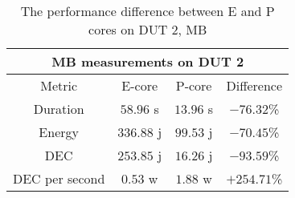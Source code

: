 \begin{table}[H]
    \centering
    \begin{tabular}{|| c | c | c | c ||}
    \hline
    \multicolumn{4}{||c||}{MB measurements on DUT 2} \\ [0.5ex] \hline\hline
    Metric & E-core & P-core & Difference \\\hline
    Duration & $58.96$ s & $13.96$ s & $-76.32$\% \\
    Energy & $336.88$ j & $99.53$ j & $-70.45$\% \\
    DEC & $253.85$ j & $16.26$ j & $-93.59$\% \\
    DEC per second & $0.53$ w & $1.88$ w & $+254.71$\% \\\hline
    \end{tabular}
    \caption{The performance difference between E and P cores on DUT 2, MB}
    \label{tab:dut-2-exp-3}
\end{table}












